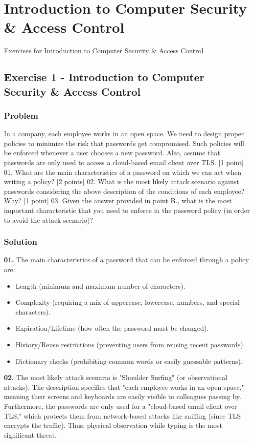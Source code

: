 \documentclass{article}
\begin{document}
\section{Introduction to Computer Security \& Access Control}
Exercises for Introduction to Computer Security \& Access Control

\subsection{Exercise 1 - Introduction to Computer Security \& Access Control}
\subsubsection*{Problem}
In a company, each employee works in an open space. We need to design proper policies to minimize the risk that passwords get compromised. Such policies will be enforced whenever a user chooses a new password. Also, assume that passwords are only used to access a cloud-based email client over TLS.
[1 point] 01. What are the main characteristics of a password on which we can act when writing a policy?
[2 points] 02. What is the most likely attack scenario against passwords considering the above description of the conditions of each employee? Why?
[1 point] 03. Given the answer provided in point B., what is the most important characteristic that you need to enforce in the password policy (in order to avoid the attack scenario)?

\subsubsection*{Solution}
\textbf{01.} The main characteristics of a password that can be enforced through a policy are:
\begin{itemize}
    \item Length (minimum and maximum number of characters).
    \item Complexity (requiring a mix of uppercase, lowercase, numbers, and special characters).
    \item Expiration/Lifetime (how often the password must be changed).
    \item History/Reuse restrictions (preventing users from reusing recent passwords).
    \item Dictionary checks (prohibiting common words or easily guessable patterns).

\end{itemize}
\textbf{02.} The most likely attack scenario is "Shoulder Surfing" (or observational attacks). The description specifies that "each employee works in an open space," meaning their screens and keyboards are easily visible to colleagues passing by. Furthermore, the passwords are only used for a "cloud-based email client over TLS," which protects them from network-based attacks like sniffing (since TLS encrypts the traffic). Thus, physical observation while typing is the most significant threat.
\end{document}
